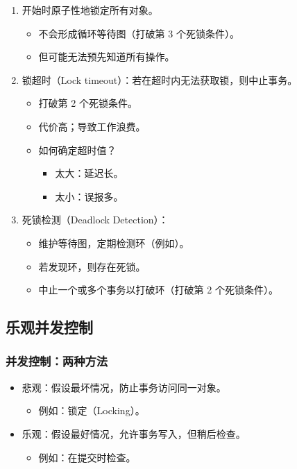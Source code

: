 \begin{enumerate}
  \item 开始时原子性地锁定所有对象。
  \begin{itemize}
    \item 不会形成循环等待图（打破第 3 个死锁条件）。
    \item 但可能无法预先知道所有操作。
  \end{itemize}
  \item 锁超时（Lock timeout）：若在超时内无法获取锁，则中止事务。
  \begin{itemize}
    \item 打破第 2 个死锁条件。
    \item 代价高；导致工作浪费。
    \item 如何确定超时值？
    \begin{itemize}
      \item 太大：延迟长。
      \item 太小：误报多。
    \end{itemize}
  \end{itemize}
  \item 死锁检测（Deadlock Detection）：
  \begin{itemize}
    \item 维护等待图，定期检测环（例如）。
    \item 若发现环，则存在死锁。
    \item 中止一个或多个事务以打破环（打破第 2 个死锁条件）。
  \end{itemize}
\end{enumerate}

\subsection{乐观并发控制}

\subsubsection{并发控制：两种方法}

\begin{itemize}
  \item 悲观：假设最坏情况，防止事务访问同一对象。
  \begin{itemize}
    \item 例如：锁定（Locking）。
  \end{itemize}
  \item 乐观：假设最好情况，允许事务写入，但稍后检查。
  \begin{itemize}
    \item 例如：在提交时检查。
  \end{itemize}
\end{itemize}

